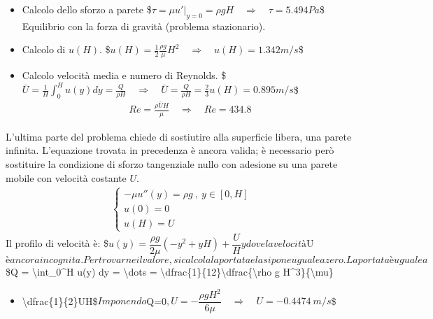\documentclass[letterpaper,10pt,italian]{jupyterBook}
\begin{document}
\begin{itemize}
\item {} 
\sphinxAtStartPar
Calcolo dello sforzo a parete
\$\(\tau = \mu u'|_{y=0} = \rho g H \quad \Rightarrow \quad \tau = 5.494 Pa\)\$
 Equilibrio con la forza di gravità (problema
stazionario).

\item {} 
\sphinxAtStartPar
Calcolo di \(u(H)\). \$\(u(H) = \frac{1}{2}\frac{\rho g}{\mu} H^2 
    \quad \Rightarrow \quad u(H) = 1.342 m/s\)\$

\item {} 
\sphinxAtStartPar
Calcolo velocità media e numero di Reynolds.
\$\(\bar{U} = \frac{1}{H}\int_{0}^{H} u(y) dy = \frac{Q}{\rho H}
    \quad \Rightarrow \quad \bar{U} = \frac{Q}{\rho H}
                                    = \frac{2}{3}u(H) = 0.895 m/s\)\$
\begin{equation*}
\begin{split}Re = \frac{\rho \bar{U} H}{\mu}
        \quad \Rightarrow \quad Re = 434.8\end{split}
\end{equation*}
\end{itemize}

\sphinxAtStartPar
L’ultima parte del problema chiede di sostiutire alla superficie libera,
una parete infinita. L’equazione trovata in precedenza è ancora valida;
è necessario però sostituire la condizione di sforzo tangenziale nullo
con adesione su una parete mobile con velocità costante \(U\).
\begin{equation*}
\begin{split}\begin{cases}
    - \mu u''(y) = \rho g \ , \ y \in[0,H] \\
    u(0) = 0  \\ u(H) = U
  \end{cases}\end{split}
\end{equation*}
\sphinxAtStartPar
Il profilo di velocità è:
\$\(u(y) = \dfrac{\rho g}{2 \mu}(-y^2 + yH) +\dfrac{U}{H}y\)\( dove la
velocità \)U\( è ancora incognita. Per trovarne il valore, si calcola la
portata e la si pone uguale a zero. La portata è uguale a
\)\$Q = \textbackslash{}int\_0\textasciicircum{}H u(y) dy = \textbackslash{}dots = \textbackslash{}dfrac\{1\}\{12\}\textbackslash{}dfrac\{\textbackslash{}rho g H\textasciicircum{}3\}\{\textbackslash{}mu\}
\begin{itemize}
\item {} 
\sphinxAtStartPar
\textbackslash{}dfrac\{1\}\{2\}UH\$\( Imponendo \)Q=0\(,
\)\(U = - \dfrac{\rho g H^2}{6 \mu} \quad \Rightarrow \quad
U = - 0.4474\ m/s\)\$

\end{itemize}
\end{document}

